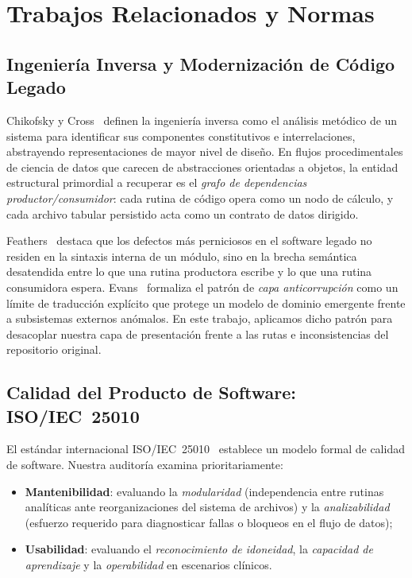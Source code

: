 \documentclass[conference]{IEEEtran}
\begin{document}
\section{Trabajos Relacionados y Normas}
\label{sec:related}

\subsection{Ingenier\'ia Inversa y Modernizaci\'on de C\'odigo Legado}

Chikofsky y Cross~\cite{Chikofsky1990} definen la ingenier\'ia inversa como el an\'alisis met\'odico de un sistema para identificar sus componentes constitutivos e interrelaciones, abstrayendo representaciones de mayor nivel de diseño. En flujos procedimentales de ciencia de datos que carecen de abstracciones orientadas a objetos, la entidad estructural primordial a recuperar es el \textit{grafo de dependencias productor/consumidor}: cada rutina de c\'odigo opera como un nodo de c\'alculo, y cada archivo tabular persistido acta como un contrato de datos dirigido.

Feathers~\cite{Feathers2004} destaca que los defectos m\'as perniciosos en el software legado no residen en la sintaxis interna de un m\'odulo, sino en la brecha sem\'antica desatendida entre lo que una rutina productora escribe y lo que una rutina consumidora espera. Evans~\cite{Evans2003} formaliza el patr\'on de \textit{capa anticorrupci\'on} como un l\'imite de traducci\'on expl\'icito que protege un modelo de dominio emergente frente a subsistemas externos an\'omalos. En este trabajo, aplicamos dicho patr\'on para desacoplar nuestra capa de presentaci\'on frente a las rutas e inconsistencias del repositorio original.

\subsection{Calidad del Producto de Software: ISO/IEC~25010}

El est\'andar internacional ISO/IEC~25010~\cite{ISO25010} establece un modelo formal de calidad de software. Nuestra auditor\'ia examina prioritariamente:
\begin{itemize}
  \item \textbf{Mantenibilidad}: evaluando la \textit{modularidad} (independencia entre rutinas anal\'iticas ante reorganizaciones del sistema de archivos) y la \textit{analizabilidad} (esfuerzo requerido para diagnosticar fallas o bloqueos en el flujo de datos);
  \item \textbf{Usabilidad}: evaluando el \textit{reconocimiento de idoneidad}, la \textit{capacidad de aprendizaje} y la \textit{operabilidad} en escenarios cl\'inicos.
\end{itemize}
\end{document}

